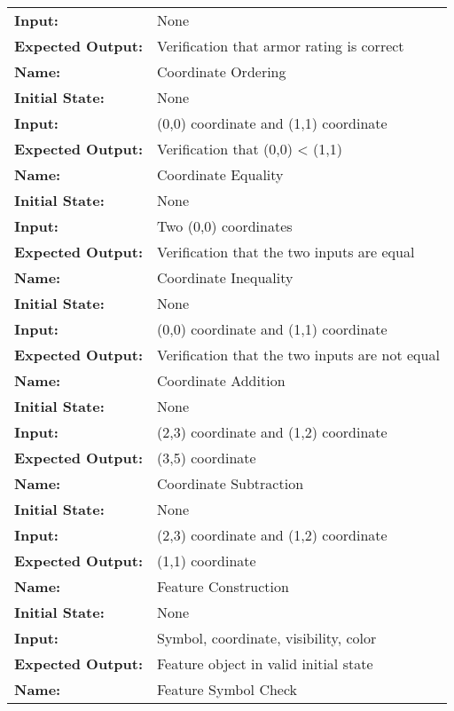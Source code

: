 \documentclass[12pt, titlepage]{article}
\begin{document}
\begin{center}
\begin{longtable}{ l | p{10cm} }
				\textbf{Input:} & None\\
				\textbf{Expected Output:} & Verification that armor rating is correct\\[1em]
				\hline
				\rule{0pt}{2em}\textbf{Name:} & Coordinate Ordering\\
				\textbf{Initial State:} & None\\
				\textbf{Input:} & (0,0) coordinate and (1,1) coordinate\\
				\textbf{Expected Output:} & Verification that (0,0) < (1,1)\\[1em]
				\hline
				\rule{0pt}{2em}\textbf{Name:} & Coordinate Equality\\
				\textbf{Initial State:} & None\\
				\textbf{Input:} & Two (0,0) coordinates\\
				\textbf{Expected Output:} & Verification that the two inputs are equal\\[1em]
				\hline
				\rule{0pt}{2em}\textbf{Name:} & Coordinate Inequality\\
				\textbf{Initial State:} & None\\
				\textbf{Input:} & (0,0) coordinate and (1,1) coordinate\\
				\textbf{Expected Output:} & Verification that the two inputs are not equal\\[1em]
				\hline
				\rule{0pt}{2em}\textbf{Name:} & Coordinate Addition\\
				\textbf{Initial State:} & None\\
				\textbf{Input:} & (2,3) coordinate and (1,2) coordinate\\
				\textbf{Expected Output:} & (3,5) coordinate\\[1em]
				\hline
				\rule{0pt}{2em}\textbf{Name:} & Coordinate Subtraction\\
				\textbf{Initial State:} & None\\
				\textbf{Input:} & (2,3) coordinate and (1,2) coordinate\\
				\textbf{Expected Output:} & (1,1) coordinate\\[1em]
				\hline
				\rule{0pt}{2em}\textbf{Name:} & Feature Construction\\
				\textbf{Initial State:} & None\\
				\textbf{Input:} & Symbol, coordinate, visibility, color\\
				\textbf{Expected Output:} & Feature object in valid initial state\\[1em]
				\hline
				\rule{0pt}{2em}\textbf{Name:} & Feature Symbol Check\\

\end{longtable}
\end{center}
\end{document}
